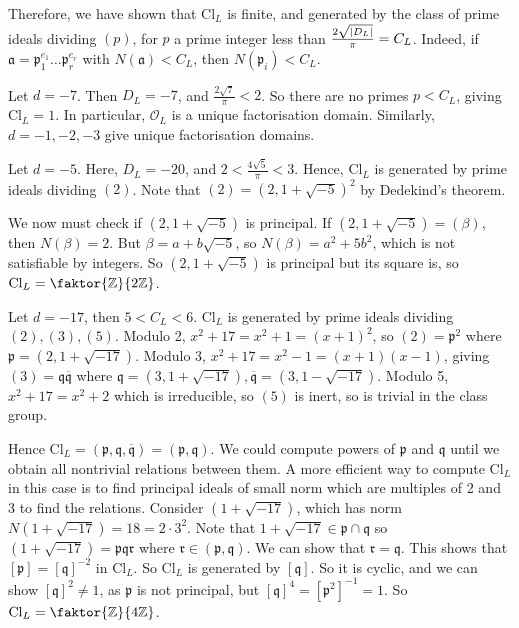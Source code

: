 Therefore, we have shown that \( \mathrm{Cl}_L \) is finite, and generated by the class of prime ideals dividing \( (p) \), for \( p \) a prime integer less than \( \frac{2\sqrt{\abs{D_L}}}{\pi} = C_L \).
Indeed, if \( \mathfrak a = \mathfrak p_1^{e_1} \dots \mathfrak p_r^{e_r} \) with \( N(\mathfrak a) < C_L \), then \( N(\mathfrak p_i) < C_L \).
\begin{example}
    Let \( d = -7 \).
    Then \( D_L = -7 \), and \( \frac{2\sqrt{7}}{\pi} < 2 \).
    So there are no primes \( p < C_L \), giving \( \mathrm{Cl}_L = \qty{1} \).
    In particular, \( \mathcal O_L \) is a unique factorisation domain.
    Similarly, \( d = -1, -2, -3 \) give unique factorisation domains.
\end{example}
\begin{example}
    Let \( d = -5 \).
    Here, \( D_L = -20 \), and \( 2 < \frac{4\sqrt{5}}{\pi} < 3 \).
    Hence, \( \mathrm{Cl}_L \) is generated by prime ideals dividing \( (2) \).
    Note that \( (2) = (2, 1 + \sqrt{-5})^2 \) by Dedekind's theorem.

    We now must check if \( (2, 1 + \sqrt{-5}) \) is principal.
    If \( (2, 1 + \sqrt{-5}) = (\beta) \), then \( N(\beta) = 2 \).
    But \( \beta = a + b\sqrt{-5} \), so \( N(\beta) = a^2 + 5 b^2 \), which is not satisfiable by integers.
    So \( (2, 1 + \sqrt{-5}) \) is principal but its square is, so \( \mathrm{Cl}_L = \faktor{\mathbb Z}{2\mathbb Z} \).
\end{example}
\begin{example}
    Let \( d = -17 \), then \( 5 < C_L < 6 \).
    \( \mathrm{Cl}_L \) is generated by prime ideals dividing \( (2), (3), (5) \).
    Modulo 2, \( x^2 + 17 = x^2 + 1 = (x + 1)^2 \), so \( (2) = \mathfrak p^2 \) where \( \mathfrak p = (2, 1 + \sqrt{-17}) \).
    Modulo 3, \( x^2 + 17 = x^2 - 1 = (x + 1)(x - 1) \), giving \( (3) = \mathfrak q \overline{\mathfrak q} \) where \( \mathfrak q = (3, 1 + \sqrt{-17}), \overline{\mathfrak q} = (3, 1 - \sqrt{-17}) \).
    Modulo 5, \( x^2 + 17 = x^2 + 2 \) which is irreducible, so \( (5) \) is inert, so is trivial in the class group.

    Hence \( \mathrm{Cl}_L = (\mathfrak p, \mathfrak q, \overline{\mathfrak q}) = (\mathfrak p, \mathfrak q) \).
    We could compute powers of \( \mathfrak p \) and \( \mathfrak q \) until we obtain all nontrivial relations between them.
    A more efficient way to compute \( \mathrm{Cl}_L \) in this case is to find principal ideals of small norm which are multiples of 2 and 3 to find the relations.
    Consider \( (1 + \sqrt{-17}) \), which has norm \( N(1 + \sqrt{-17}) = 18 = 2 \cdot 3^2 \).
    Note that \( 1 + \sqrt{-17} \in \mathfrak p \cap \mathfrak q \) so \( (1 + \sqrt{-17}) = \mathfrak p \mathfrak q \mathfrak r \) where \( \mathfrak r \in (\mathfrak p, \mathfrak q) \).
    We can show that \( \mathfrak r = \mathfrak q \).
    This shows that \( [\mathfrak p] = [\mathfrak q]^{-2} \) in \( \mathrm{Cl}_L \).
    So \( \mathrm{Cl}_L \) is generated by \( [\mathfrak q] \).
    So it is cyclic, and we can show \( [\mathfrak q]^2 \neq 1 \), as \( \mathfrak p \) is not principal, but \( [\mathfrak q]^4 = [\mathfrak p^2]^{-1} = 1 \).
    So \( \mathrm{Cl}_L = \faktor{\mathbb Z}{4\mathbb Z} \).
\end{example}
